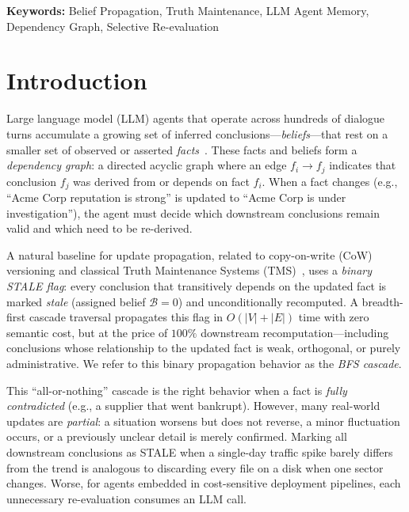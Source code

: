\documentclass{article}
\theoremstyle{definition}
\begin{document}
\noindent\textbf{Keywords:} Belief Propagation, Truth Maintenance, LLM Agent Memory, Dependency Graph, Selective Re-evaluation

\tableofcontents

\section{Introduction}

Large language model (LLM) agents that operate across hundreds of
dialogue turns accumulate a growing set of inferred
conclusions---\emph{beliefs}---that rest on a smaller set of observed or
asserted \emph{facts}~\cite{memgpt,mem0,zep,react2023,park2023generative}. These facts and beliefs form
a \emph{dependency graph}: a directed acyclic graph where an edge
$f_i \to f_j$ indicates that conclusion $f_j$ was derived from or depends
on fact $f_i$. When a fact changes (e.g., ``Acme Corp reputation is
strong'' is updated to ``Acme Corp is under investigation''), the agent
must decide which downstream conclusions remain valid and which need to
be re-derived.

A natural baseline for update propagation, related to copy-on-write
(CoW) versioning and
classical Truth Maintenance Systems (TMS)~\cite{doyle1979tms,
dekleer1986atms}, uses a \emph{binary STALE flag}: every conclusion that
transitively depends on the updated fact is marked \emph{stale}
(assigned belief $\mathcal{B}=0$) and unconditionally recomputed. A breadth-first cascade
traversal propagates this flag in $O(|V|+|E|)$ time with zero semantic
cost, but at the price of $100\%$ downstream recomputation---including
conclusions whose relationship to the updated fact is weak, orthogonal,
or purely administrative. We refer to this binary propagation behavior
as the \emph{BFS cascade}.

This ``all-or-nothing'' cascade is the right behavior when a fact is
\emph{fully contradicted} (e.g., a supplier that went bankrupt).
However, many real-world updates are \emph{partial}: a situation worsens
but does not reverse, a minor fluctuation occurs, or a previously unclear
detail is merely confirmed. Marking all downstream conclusions as STALE
when a single-day traffic spike barely differs from the trend is
analogous to discarding every file on a disk when one sector changes.
Worse, for agents embedded in cost-sensitive deployment pipelines, each
unnecessary re-evaluation consumes an LLM call.
\end{document}
